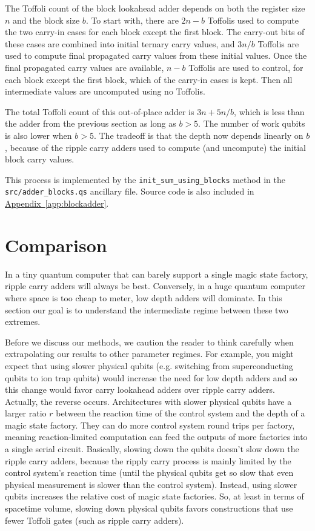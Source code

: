 \documentclass[onecolumn,unpublished]{quantumarticle}
\theoremstyle{definition}
\theoremstyle{definition}
\theoremstyle{definition}
\DeclareRobustCommand{\app}[1]{\hyperref[app:#1]{Appendix~\ref*{app:#1}}}
\begin{document}
The Toffoli count of the block lookahead adder depends on both the register size $n$ and the block size $b$.
To start with, there are $2n-b$ Toffolis used to compute the two carry-in cases for each block except the first block.
The carry-out bits of these cases are combined into initial ternary carry values, and $3n/b$ Toffolis are used to compute final propagated carry values from these initial values.
Once the final propagated carry values are available, $n-b$ Toffolis are used to control, for each block except the first block, which of the carry-in cases is kept.
Then all intermediate values are uncomputed using no Toffolis.

The total Toffoli count of this out-of-place adder is $3n + 5n/b$, which is less than the adder from the previous section as long as $b > 5$.
The number of work qubits is also lower when $b > 5$.
The tradeoff is that the depth now depends linearly on $b$, because of the ripple carry adders used to compute (and uncompute) the initial block carry values.

This process is implemented by the \texttt{init\_sum\_using\_blocks} method in the \\\texttt{src/adder\_blocks.qs} ancillary file.
Source code is also included in \app{blockadder}.


\section{Comparison}
\label{sec:estimate}

In a tiny quantum computer that can barely support a single magic state factory, ripple carry adders will always be best.
Conversely, in a huge quantum computer where space is too cheap to meter, low depth adders will dominate.
In this section our goal is to understand the intermediate regime between these two extremes.

Before we discuss our methods, we caution the reader to think carefully when extrapolating our results to other parameter regimes.
For example, you might expect that using slower physical qubits (e.g. switching from superconducting qubits to ion trap qubits) would increase the need for low depth adders and so this change would favor carry lookahead adders over ripple carry adders.
Actually, the reverse occurs.
Architectures with slower physical qubits have a larger ratio $r$ between the reaction time of the control system and the depth of a magic state factory.
They can do more control system round trips per factory, meaning reaction-limited computation can feed the outputs of more factories into a single serial circuit.
Basically, slowing down the qubits doesn't slow down the ripple carry adders, because the ripply carry process is mainly limited by the control system's reaction time (until the physical qubits get so slow that even physical measurement is slower than the control system).
Instead, using slower qubits increases the relative cost of magic state factories.
So, at least in terms of spacetime volume, slowing down physical qubits favors constructions that use fewer Toffoli gates (such as ripple carry adders).
\end{document}
